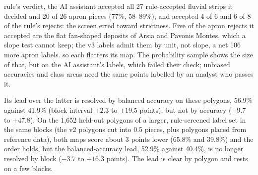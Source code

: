 rule's verdict, the AI assistant accepted all 27 rule-accepted fluvial strips it decided and 20 of 26 apron pieces
(77\%, 58--89\%), and accepted 4 of 6 and 6 of 8 of the rule's rejects: the screen erred toward strictness. Five
of the apron rejects it accepted are the flat fan-shaped deposits of Arsia and Pavonis Montes, which a slope test
cannot keep; the v3 labels admit them by unit, not slope, a net 106 more apron labels.
so each flatters its map. The probability sample shows the size of that, but on the AI assistant's labels, which
failed their check; unbiased accuracies and class areas need the same points labelled by an analyst who passes it.

Its lead over the latter is resolved by balanced accuracy on these polygons, 56.9\% against 41.9\% (block interval
$+2.3$ to $+19.5$ points), but not by accuracy ($-9.7$ to $+47.8$).
On the 1,652 held-out polygons of a larger, rule-screened label set in the same blocks (the v2 polygons cut into
0.5\textdegree{} pieces, plus polygons placed from reference data), both maps score about 3 points lower (65.8\% and
39.8\%) and the order holds, but the balanced-accuracy lead, 52.9\% against 40.4\%, is no longer resolved by block
($-3.7$ to $+16.3$ points). The lead is clear by polygon and rests on a few blocks. %

